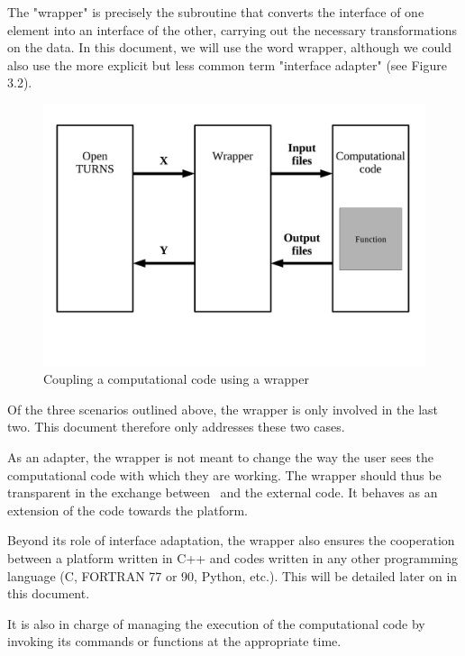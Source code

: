 The "wrapper" is precisely the subroutine that converts the interface of one element into an interface of the other, carrying out the necessary transformations on the data. In this document, we will use the word wrapper, although we could also use the more explicit but less common term "interface adapter" (see Figure 3.2).

\begin{figure}
\begin{center}
\includegraphics[width=12cm]{Figures/wrapper/Figure2.pdf}
\caption[Figure 2]{Coupling a computational code using a wrapper}
\end{center}
\end{figure}

Of the three scenarios outlined above, the wrapper is only involved in the last two. This document therefore only addresses these two cases.

As an adapter, the wrapper is not meant to change the way the user sees the computational code with which they are working. The wrapper should thus be transparent in the exchange between \OT\ and the external code. It behaves as an extension of the code towards the platform.

Beyond its role of interface adaptation, the wrapper also ensures the cooperation between a platform written in C++ and codes written in any other programming language (C, FORTRAN 77 or 90, Python, etc.). This will be detailed later on in this document.

It is also in charge of managing the execution of the computational code by invoking its commands or functions at the appropriate time.

